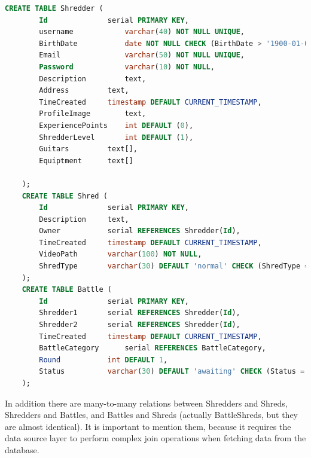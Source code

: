 \begin{lstlisting}[language=SQL]
	CREATE TABLE Shredder (
		Id				serial PRIMARY KEY, 
		username			varchar(40) NOT NULL UNIQUE,
		BirthDate			date NOT NULL CHECK (BirthDate > '1900-01-01'),
		Email				varchar(50) NOT NULL UNIQUE,
		Password			varchar(10) NOT NULL,
		Description			text,
		Address			text,
		TimeCreated		timestamp DEFAULT CURRENT_TIMESTAMP,
		ProfileImage		text,
		ExperiencePoints	int	DEFAULT (0),
		ShredderLevel		int DEFAULT (1),
		Guitars			text[],
		Equiptment		text[]
		
	);
	CREATE TABLE Shred (
		Id				serial PRIMARY KEY,
		Description		text,
		Owner			serial REFERENCES Shredder(Id),
		TimeCreated		timestamp DEFAULT CURRENT_TIMESTAMP,
		VideoPath		varchar(100) NOT NULL,
		ShredType		varchar(30) DEFAULT 'normal' CHECK (ShredType ='normal' or ShredType = 'battle')
	);	
	CREATE TABLE Battle (
		Id				serial PRIMARY KEY,
		Shredder1		serial REFERENCES Shredder(Id),
		Shredder2		serial REFERENCES Shredder(Id),
		TimeCreated		timestamp DEFAULT CURRENT_TIMESTAMP,
		BattleCategory		serial REFERENCES BattleCategory,
		Round			int DEFAULT 1,
		Status			varchar(30) DEFAULT 'awaiting' CHECK (Status ='accepted' or Status ='declined' or Status='awaiting');
	);	
\end{lstlisting}

In addition there are many-to-many relations between Shredders and Shreds, Shredders and Battles, and Battles and Shreds (actually BattleShreds, but they are almost identical). It is important to mention them, because it requires the data source layer to perform complex join operations when fetching data from the database.

